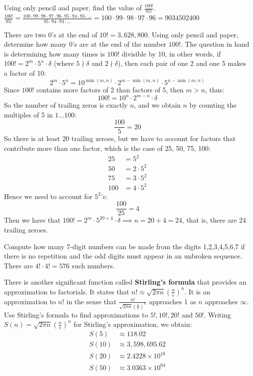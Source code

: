 \documentclass[DIN, pagenumber=false, fontsize=11pt, parskip=half]{scrartcl}
\begin{document}
\begin{problems}
    \problem Using only pencil and paper, find the value of $\frac{100!}{95!}$.
    \answer $\frac{100!}{95!} = \frac{100\cdot99\cdot98\cdot97\cdot96\cdot95\cdot94\cdot93\cdot...}{95\cdot94\cdot93\cdot...} = 100\cdot99\cdot98\cdot97\cdot96 = 9034502400$

    \problem There are two 0's at the end of $10! = 3,628,800$. Using only pencil and paper, determine how many 0's are at the end of the number $100!$. 
    \answer The question in hand is determining how many times is $100!$ divisible by 10, in other words, if $100! = 2^m \cdot 5^n \cdot \delta$ (where $5 \nmid \delta$ and $2 \nmid \delta$), then each pair of one 2 and one 5 makes a factor of 10:
    \[
        2^m \cdot 5^n = 10^{\min(m,n)} \cdot 2^{m-\min(m,n)} \cdot 5^{n-\min(m,n)}
    \]
    Since $100!$ contains more factors of 2 than factors of 5, then $m > n$, thus:
    \[
        100! = 10^n \cdot 2^{m-n} \cdot \delta
    \]
    So the number of trailing zeros is exactly $n$, and we obtain $n$ by counting the multiples of 5 in $1 \ldots 100$:
    \[
        \frac{100}{5} = 20
    \]
    So there is at least 20 trailing zeroes, but we have to account for factors that contribute more than one factor, which is the case of 25, 50, 75, 100:
    \begin{align}
        \nonumber 25 & = 5^2\\ 
        \nonumber 50 & = 2 \cdot 5^2\\ 
        \nonumber 75 & = 3 \cdot 5^2\\ 
        \nonumber 100 &= 4 \cdot 5^2
    \end{align}
    Hence we need to account for $5^2$'s:
    \[
        \frac{100}{25} = 4
    \]
    Then we have that $100! = 2^m \cdot 5^{20+4} \cdot \delta \implies n = 20 + 4 = 24$, that is, there are 24 trailing zeroes.


    \problem Compute how many 7-digit numbers can be made from the digits 1,2,3,4,5,6,7 if there is no repetition and the odd digits must appear in an unbroken sequence.
    \answer There are $4! \cdot 4! = 576$ such numbers.

    \problem There is another significant function called \textbf{Stirling's formula} that provides an approximation to factorials. It states that $n! \approx \sqrt{2\pi n}(\frac{n}{e})^n$. It is an approximation to $n!$ in the sense that $\frac{n!}{\sqrt{2 \pi n }(\frac{n}{e})^n}$ approaches 1 as $n$ approaches $\infty$. Use Stirling's formula to find approximations to $5!, 10!, 20!$ and $50!$.
    \answer Writing $S(n) = \sqrt{2\pi n}\left(\frac{n}{e}\right)^n$ for Stirling's approximation, we obtain:
    \begin{align}
        \nonumber S(5)  & \approx 118.02\\
        \nonumber S(10) & \approx 3{,}598{,}695.62\\
        \nonumber S(20) & \approx 2.4228 \times 10^{18}\\
        \nonumber S(50) & \approx 3.0363 \times 10^{64}
    \end{align}
\end{problems}
\end{document}
